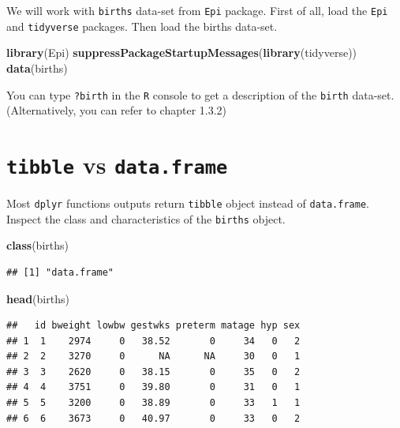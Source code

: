 \documentclass[
]{book}
\newenvironment{Shaded}{\begin{snugshade}}{\end{snugshade}}
\newcommand{\FunctionTok}[1]{\textcolor[rgb]{0.13,0.29,0.53}{\textbf{#1}}}
\newcommand{\NormalTok}[1]{#1}
\theoremstyle{definition}
\theoremstyle{definition}
\theoremstyle{definition}
\theoremstyle{definition}
\theoremstyle{remark}
\begin{document}
We will work with \texttt{births} data-set from \texttt{Epi} package.
First of all, load the \texttt{Epi} and \texttt{tidyverse} packages.
Then load the births data-set.

\begin{Shaded}
\begin{Highlighting}[]
\FunctionTok{library}\NormalTok{(Epi)}
\FunctionTok{suppressPackageStartupMessages}\NormalTok{(}\FunctionTok{library}\NormalTok{(tidyverse))}
\FunctionTok{data}\NormalTok{(births)}
\end{Highlighting}
\end{Shaded}

You can type \texttt{?birth} in the \texttt{R} console to get a description of the \texttt{birth} data-set. (Alternatively, you can refer to chapter 1.3.2)

\section{\texorpdfstring{\texttt{tibble} vs \texttt{data.frame}}{tibble vs data.frame}}\label{tibble-vs-data.frame}

Most \texttt{dplyr} functions outputs return \texttt{tibble} object instead of
\texttt{data.frame}.
Inspect the class and characteristics of the \texttt{births} object.

\begin{Shaded}
\begin{Highlighting}[]
\FunctionTok{class}\NormalTok{(births)}
\end{Highlighting}
\end{Shaded}

\begin{verbatim}
## [1] "data.frame"
\end{verbatim}

\begin{Shaded}
\begin{Highlighting}[]
\FunctionTok{head}\NormalTok{(births)}
\end{Highlighting}
\end{Shaded}

\begin{verbatim}
##   id bweight lowbw gestwks preterm matage hyp sex
## 1  1    2974     0   38.52       0     34   0   2
## 2  2    3270     0      NA      NA     30   0   1
## 3  3    2620     0   38.15       0     35   0   2
## 4  4    3751     0   39.80       0     31   0   1
## 5  5    3200     0   38.89       0     33   1   1
## 6  6    3673     0   40.97       0     33   0   2
\end{verbatim}
\end{document}
